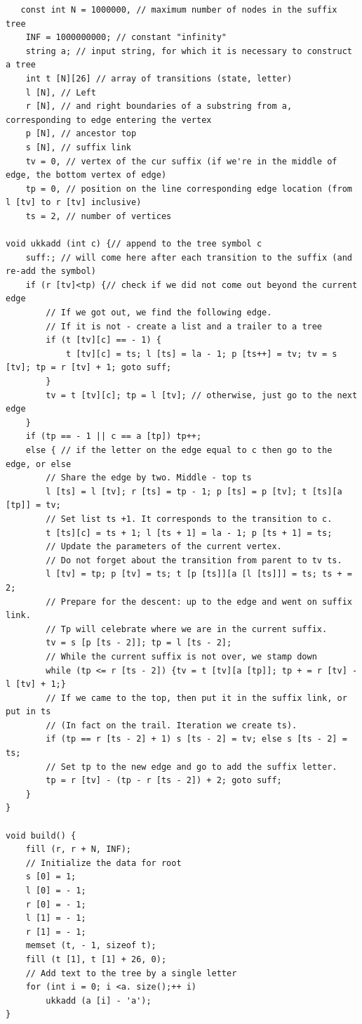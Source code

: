 \begin{verbatim}
   const int N = 1000000, // ​​maximum number of nodes in the suffix tree
    INF = 1000000000; // constant "infinity"
    string a; // input string, for which it is necessary to construct a tree
    int t [N][26] // array of transitions (state, letter)
    l [N], // ​​Left
    r [N], // ​​and right boundaries of a substring from a, corresponding to edge entering the vertex
    p [N], // ​​ancestor top
    s [N], // ​​suffix link
    tv = 0, // ​​vertex of the cur suffix (if we're in the middle of edge, the bottom vertex of edge)
    tp = 0, // ​​position on the line corresponding edge location (from l [tv] to r [tv] inclusive)
    ts = 2, // ​​number of vertices
 
void ukkadd (int c) {// append to the tree symbol c
    suff:; // will come here after each transition to the suffix (and re-add the symbol)
    if (r [tv]<tp) {// check if we did not come out beyond the current edge
        // If we got out, we find the following edge.
        // If it is not - create a list and a trailer to a tree
        if (t [tv][c] == - 1) {
            t [tv][c] = ts; l [ts] = la - 1; p [ts++] = tv; tv = s [tv]; tp = r [tv] + 1; goto suff;
        }
        tv = t [tv][c]; tp = l [tv]; // otherwise, just go to the next edge
    }
    if (tp == - 1 || c == a [tp]) tp++;
    else { // if the letter on the edge equal to c then go to the edge, or else
        // Share the edge by two. Middle - top ts
        l [ts] = l [tv]; r [ts] = tp - 1; p [ts] = p [tv]; t [ts][a [tp]] = tv;
        // Set list ts +1. It corresponds to the transition to c.
        t [ts][c] = ts + 1; l [ts + 1] = la - 1; p [ts + 1] = ts;
        // Update the parameters of the current vertex.
        // Do not forget about the transition from parent to tv ts.
        l [tv] = tp; p [tv] = ts; t [p [ts]][a [l [ts]]] = ts; ts + = 2;
        // Prepare for the descent: up to the edge and went on suffix link.
        // Tp will celebrate where we are in the current suffix.
        tv = s [p [ts - 2]]; tp = l [ts - 2];
        // While the current suffix is ​​not over, we stamp down
        while (tp <= r [ts - 2]) {tv = t [tv][a [tp]]; tp + = r [tv] - l [tv] + 1;}
        // If we came to the top, then put it in the suffix link, or put in ts
        // (In fact on the trail. Iteration we create ts).
        if (tp == r [ts - 2] + 1) s [ts - 2] = tv; else s [ts - 2] = ts;
        // Set tp to the new edge and go to add the suffix letter.
        tp = r [tv] - (tp - r [ts - 2]) + 2; goto suff;
    }
}
 
void build() {
    fill (r, r + N, INF);
    // Initialize the data for root
    s [0] = 1;
    l [0] = - 1;
    r [0] = - 1;
    l [1] = - 1;
    r [1] = - 1;
    memset (t, - 1, sizeof t);
    fill (t [1], t [1] + 26, 0);
    // Add text to the tree by a single letter
    for (int i = 0; i <a. size();++ i)
        ukkadd (a [i] - 'a');
}
\end{verbatim}
